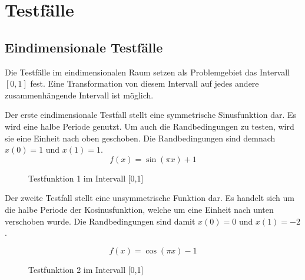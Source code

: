\section{Testfälle}
\subsection{Eindimensionale Testfälle}

Die Testfälle im eindimensionalen Raum setzen als Problemgebiet das
Intervall $[0,1]$ fest. Eine Transformation von diesem Intervall auf jedes 
andere zusammenhängende Intervall ist möglich.

Der erste eindimensionale Testfall stellt eine symmetrische Sinusfunktion
dar. Es wird eine halbe Periode genutzt. Um auch die Randbedingungen zu testen,
wird sie eine Einheit nach oben geschoben. Die Randbedingungen sind demnach
$x(0) =1$ und $x(1)=1$.
\begin{equation}
f(x) = \sin(\pi x)+1
\end{equation}
\begin{figure}[h]
\centering
\caption{Testfunktion 1 im Intervall [0,1]}
\label{fig:testfn1}
\end{figure}


Der zweite Testfall stellt eine unsymmetrische Funktion dar. Es handelt sich um
die halbe Periode der Kosinusfunktion, welche um eine Einheit nach unten verschoben wurde.
Die Randbedingungen sind damit
$x(0) =0$ und $x(1)=-2$.

\begin{equation}
f(x) = \cos(\pi x) -1
\end{equation}
\begin{figure}[h]
\centering
\caption{Testfunktion 2 im Intervall [0,1]}
\label{fig:testfn2}
\end{figure}

